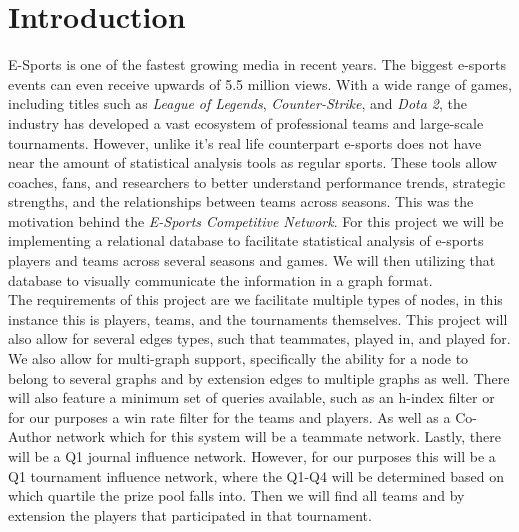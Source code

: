 \documentclass[sigconf]{acmart}
\begin{document}
\section{Introduction}
E-Sports is one of the fastest growing media in recent years. The biggest e-sports events can even receive upwards of 5.5 million views. With a wide range of games, including titles such as \textit{League of Legends}, \textit{Counter-Strike}, and \textit{Dota 2}, the industry has developed a vast ecosystem of professional teams and large-scale tournaments. However, unlike it's real life counterpart e-sports does not have near the amount of statistical analysis tools as regular sports. These tools allow coaches, fans, and researchers to better understand performance trends, strategic strengths, and the relationships between teams across seasons. This was the motivation behind the \textit{E-Sports Competitive Network}. For this project we will be implementing a relational database to facilitate statistical analysis of e-sports players and teams across several seasons and games. We will then utilizing that database to visually communicate the information in a graph format.\\
The requirements of this project are we facilitate multiple types of nodes, in this instance this is players, teams, and the tournaments themselves. This project will also allow for several edges types, such that teammates, played in, and played for. We also allow for multi-graph support, specifically the ability for a node to belong to several graphs and by extension edges to multiple graphs as well. There will also feature a minimum set of queries available, such as an h-index filter or for our purposes a win rate filter for the teams and players. As well as a Co-Author network which for this system will be a teammate network.  Lastly, there will be a Q1 journal influence network. However, for our purposes this will be a Q1 tournament influence network, where the Q1-Q4 will be determined based on which quartile the prize pool falls into. Then we will find all teams and by extension the players that participated in that tournament.
\end{document}
